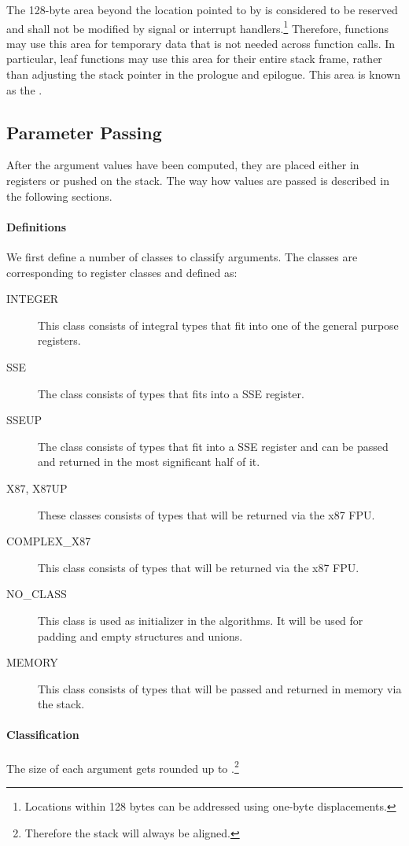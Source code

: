 The 128-byte area beyond the location pointed to by \RSP is considered
to be reserved and shall not be modified by signal or interrupt
handlers.\footnote{Locations within 128 bytes can be addressed using
  one-byte displacements.}  Therefore, functions may use this area for
temporary data that is not needed across function calls.  In
particular, leaf functions may use this area for their entire stack
frame, rather than adjusting the stack pointer in the prologue and
epilogue.  This area is known as the .

\subsection{Parameter Passing}
\label{sec-calling-conventions}

After the argument values have been computed, they are placed either in
registers or pushed on the stack.  The way how values are passed is
described in the following sections.

\paragraph{Definitions}
We first define a number of classes to classify arguments.  The
classes are corresponding to \xARCH register classes and defined as:

\begin{description}
\item[INTEGER] This class consists of integral types that fit into one of
  the general purpose registers.
\item[SSE] The class consists of types that fits into a SSE register.
\item[SSEUP] The class consists of types that fit into a SSE register
  and can be passed and returned in the most significant half of it.
\item[X87, X87UP] These classes consists of types that will be returned via
  the x87 FPU.
\item[COMPLEX\_X87] This class consists of types that will be returned
  via the x87 FPU.
\item[NO\_CLASS] This class is used as initializer in the algorithms.  It
  will be used for padding and empty structures and unions.
\item[MEMORY] This class consists of types that will be passed and
  returned in memory via the stack.
\end{description}


\paragraph{Classification}
The size of each argument gets rounded up to
\eightbytes.\footnote{Therefore the stack will always be \eightbyte aligned.}


